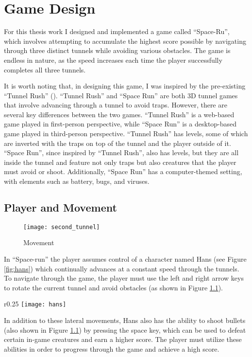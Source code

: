 \chapter{Game Design}
For this thesis work I designed and implemented a game called ``Space-Ru'', which involves attempting to accumulate the highest score possible by navigating through three distinct tunnels while avoiding various obstacles. The game is endless in nature, as the speed increases each time the player successfully completes all three tunnels. 

It is worth noting that, in designing this game, I was inspired by the pre-existing ``Tunnel Rush'' (\cite{tunnelrush}). ``Tunnel Rush'' and ``Space Run'' are both 3D tunnel games that involve advancing through a tunnel to avoid traps. However, there are several key differences between the two games. ``Tunnel Rush'' is a web-based game played in first-person perspective, while ``Space Run'' is a desktop-based game played in third-person perspective. ``Tunnel Rush'' has levels, some of which are inverted with the traps on top of the tunnel and the player outside of it. ``Space Run'', since inspired by ``Tunnel Rush'', also has levels, but they are all inside the tunnel and feature not only traps but also creatures that the player must avoid or shoot. Additionally, ``Space Run'' has a computer-themed setting, with elements such as battery, bugs, and viruses.

\section{Player and Movement}

\begin{figure}[h]
    \centering
    \texttt{[image: second\_tunnel]}
    \caption{Movement}
    \label{fig:snd_tunnel}
\end{figure}

In ``Space-run'' the player assumes control of a character named Hans (see Figure \ref{fig:hans}) which continually advances at a constant speed through the tunnels. To navigate through the game, the player must use the left and right arrow keys to rotate the current tunnel and avoid obstacles (as shown in Figure \ref{fig:snd_tunnel}). 
\begin{wrapfigure}{r}{0.25\textwidth}
    \centering
    \texttt{[image: hans]}
    \caption{Hans}
    \label{fig:hans}
\end{wrapfigure}
In addition to these lateral movements, Hans also has the ability to shoot bullets (also shown in Figure \ref{fig:snd_tunnel}) by pressing the space key, which can be used to defeat certain in-game creatures and earn a higher score. The player must utilize these abilities in order to progress through the game and achieve a high score.

